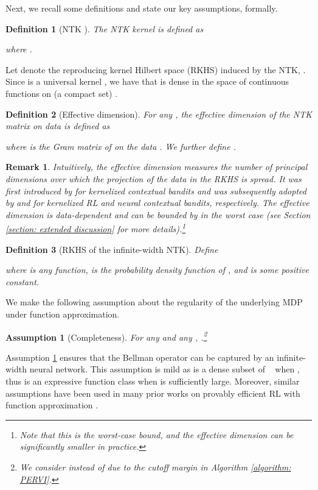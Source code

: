 \documentclass{article} \usepackage{iclr2023/iclr2023_conference,times}
\newtheorem{defn}{Definition}
\newtheorem{assumption}{Assumption}[section]
\newtheorem{remark}{Remark}
\begin{document}
Next, we recall some definitions and state our key assumptions, formally. 






\begin{defn}[NTK \citep{jacot2018neural}]
The NTK kernel  is defined as

{where .}
\label{definition: ntk}
\end{defn}
Let  denote the reproducing kernel Hilbert space (RKHS) induced by the NTK, . {Since is a universal kernel \citep{DBLP:conf/iclr/JiTX20}, we have that  is dense in the space of continuous functions on (a compact set)  \citep{Rahimi08}.} 

\begin{defn}[Effective dimension]
For any , the effective dimension of the NTK matrix on data  is defined as 

where  is the Gram matrix of  on the data . We further define . 
\label{definition: effective dimension}
\end{defn}
\begin{remark}
Intuitively, the effective dimension  measures the number of principal dimensions over which the projection of the data  in the RKHS  is spread. It was first introduced by \citet{valko2013finite} for kernelized contextual bandits and was subsequently adopted by \citet{yang2020reinforcement} and \citet{zhou2020neural} for kernelized RL and neural contextual bandits, respectively. The effective dimension is data-dependent and can be bounded by  in the worst case (see Section \ref{section: extended discussion} for more details).\footnote{Note that this is the worst-case bound, and the effective dimension can be significantly smaller in practice.} 
\end{remark}



{
\begin{defn}[RKHS of the infinite-width NTK] 
Define  

where  is any function,  is the probability density function of , and  is some positive constant.
\label{eq: target function class}
\end{defn}
}



We make the following assumption about the regularity of the underlying MDP under function approximation. 
\begin{assumption}[Completeness]
For any  and any , .\footnote{We consider  instead of  due to the cutoff margin  in Algorithm \ref{algorithm: PERVI}.}
\label{assumption: completeness}
\end{assumption}
Assumption \ref{assumption: completeness} ensures that the Bellman operator  can be captured by an infinite-width neural network. This assumption is mild as   is a dense subset of ~\citep[Lemma~C.1]{gao2019convergence} when , thus  is an expressive function class when  is sufficiently large. Moreover, similar assumptions have been used in many prior works on provably efficient RL with function approximation \citep{cai2019neural,wang2020reinforcement,yang2020function,nguyentang2021sample}.
\end{document}
